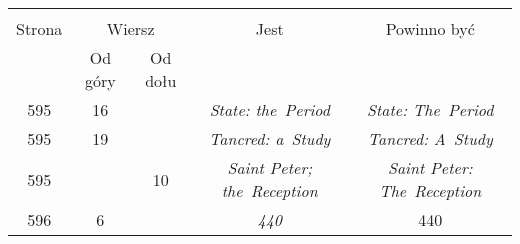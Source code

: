 \documentclass[a4paper,11pt]{article}
\begin{document}
\begin{center}
  \begin{tabular}{|c|c|c|c|c|}
    \hline
    & \multicolumn{2}{c|}{} & & \\
    Strona & \multicolumn{2}{c|}{Wiersz}& Jest
                              & Powinno być \\ \cline{2-3}
    & Od góry & Od dołu & & \\
    \hline
    595 & 16 & & \textit{State: the~Period} & \textit{State: The~Period} \\
    595 & 19 & & \textit{Tancred: a~Study} & \textit{Tancred: A~Study} \\
    595 & & 10 & \textit{Saint Peter; the~Reception}
           & \textit{Saint Peter: The~Reception} \\
    596 &  6 & & \textit{440} & 440 \\
    \hline
  \end{tabular}

\end{center}
\end{document}
